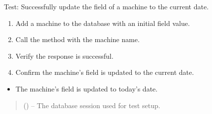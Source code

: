\documentclass[letterpaper,10pt,english]{sphinxmanual}
\begin{document}
\begin{fulllineitems}
\label{\detokenize{test:test.test_machine.test_update_machine_date_success}}
\pysigstartsignatures
\pysiglinewithargsret
{}
{}
{}
\pysigstopsignatures
\sphinxAtStartPar
Test: Successfully update the  field of a machine to the current date.
\begin{description}
\begin{enumerate}
%
\item {} 
\sphinxAtStartPar
Add a machine to the database with an initial  field value.

\item {} 
\sphinxAtStartPar
Call the  method with the machine name.

\item {} 
\sphinxAtStartPar
Verify the response is successful.

\item {} 
\sphinxAtStartPar
Confirm the machine’s  field is updated to the current date.

\end{enumerate}

\begin{itemize}
\item {} 
\sphinxAtStartPar
The machine’s  field is updated to today’s date.

\end{itemize}

\end{description}
\begin{quote}\begin{description}
\sphinxAtStartPar
{} () – The database session used for test setup.

\end{description}\end{quote}

\end{fulllineitems}

\end{document}
